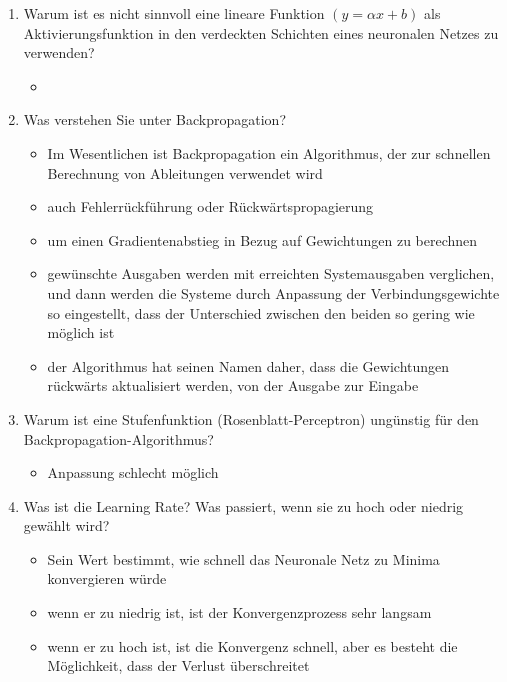 \documentclass[a4paper,12pt,titlepage]{scrartcl}
\begin{document}
\begin{enumerate}
\begin{itemize}
          \end{itemize}
    \item Warum ist es nicht sinnvoll eine lineare Funktion $(y=\alpha x+b)$ als Aktivierungsfunktion in den verdeckten Schichten eines neuronalen Netzes zu verwenden?
          \begin{itemize}
              \item
          \end{itemize}
    \item Was verstehen Sie unter Backpropagation?
          \begin{itemize}
              \item Im Wesentlichen ist Backpropagation ein Algorithmus, der zur schnellen Berechnung von Ableitungen verwendet wird
              \item auch Fehlerrückführung oder Rückwärtspropagierung
              \item um einen Gradientenabstieg in Bezug auf Gewichtungen zu berechnen
              \item gewünschte Ausgaben werden mit erreichten Systemausgaben verglichen, und dann werden die Systeme durch Anpassung der Verbindungsgewichte so eingestellt, dass der Unterschied zwischen den beiden so gering wie möglich ist
              \item der Algorithmus hat seinen Namen daher, dass die Gewichtungen rückwärts aktualisiert werden, von der Ausgabe zur Eingabe
          \end{itemize}
    \item Warum ist eine Stufenfunktion (Rosenblatt-Perceptron) ungünstig für den Backpropagation-Algorithmus?
          \begin{itemize}
              \item Anpassung schlecht möglich
          \end{itemize}
    \item Was ist die Learning Rate? Was passiert, wenn sie zu hoch oder niedrig gewählt wird?
          \begin{itemize}
              \item Sein Wert bestimmt, wie schnell das Neuronale Netz zu Minima konvergieren würde
              \item wenn er zu niedrig ist, ist der Konvergenzprozess sehr langsam
              \item wenn er zu hoch ist, ist die Konvergenz schnell, aber es besteht die Möglichkeit, dass der Verlust überschreitet
          \end{itemize}

\end{enumerate}
\end{document}
